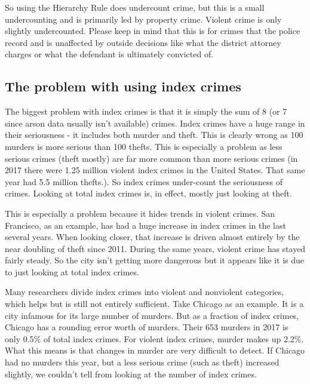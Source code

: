\documentclass[
  12pt,
  openany]{book}
\begin{document}
So using the Hierarchy Rule does undercount crime, but this is a small undercounting and is primarily led by property crime. Violent crime is only slightly undercounted. Please keep in mind that this is for crimes that the police record and is unaffected by outside decisions like what the district attorney charges or what the defendant is ultimately convicted of.

\hypertarget{the-problem-with-using-index-crimes}{%
\subsection{The problem with using index crimes}\label{the-problem-with-using-index-crimes}}

The biggest problem with index crimes is that it is simply the sum of 8 (or 7 since arson data usually isn't available) crimes. Index crimes have a huge range in their seriousness - it includes both murder and theft. This is clearly wrong as 100 murders is more serious than 100 thefts. This is especially a problem as less serious crimes (theft mostly) are far more common than more serious crimes (in 2017 there were 1.25 million violent index crimes in the United States. That same year had 5.5 million thefts.). So index crimes under-count the seriousness of crimes. Looking at total index crimes is, in effect, mostly just looking at theft.

This is especially a problem because it hides trends in violent crimes. San Francisco, as an example, has had a huge increase in index crimes in the last several years. When looking closer, that increase is driven almost entirely by the near doubling of theft since 2011. During the same years, violent crime has stayed fairly steady. So the city isn't getting more dangerous but it appears like it is due to just looking at total index crimes.

Many researchers divide index crimes into violent and nonviolent categories, which helps but is still not entirely sufficient. Take Chicago as an example. It is a city infamous for its large number of murders. But as a fraction of index crimes, Chicago has a rounding error worth of murders. Their 653 murders in 2017 is only 0.5\% of total index crimes. For violent index crimes, murder makes up 2.2\%. What this means is that changes in murder are very difficult to detect. If Chicago had no murders this year, but a less serious crime (such as theft) increased slightly, we couldn't tell from looking at the number of index crimes.
\end{document}
